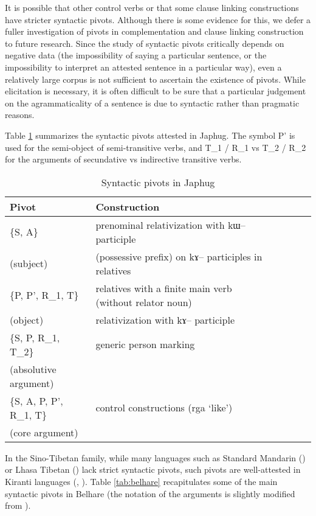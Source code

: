 \documentclass[oldfontcommands,oneside,a4paper,11pt]{article}
\newcommand{\ipa}[1]{{\phon #1}} %
\begin{document}
It is possible that other control verbs or that some clause linking constructions have  stricter syntactic pivots. Although there is some evidence for this, we defer a fuller investigation of pivots in complementation and clause linking construction to future research. Since the study of syntactic pivots critically depends on negative data (the impossibility of saying a particular sentence, or the impossibility to interpret an attested sentence in a particular way), even a relatively large corpus is not sufficient to ascertain the existence of pivots. While elicitation is necessary, it is often difficult to be sure that a particular judgement on the agrammaticality of a sentence is due to syntactic rather than pragmatic reasons. 
 
Table \ref{tab:japhug.pivot} summarizes the syntactic pivots  attested in Japhug. The symbol P' is used for the semi-object of semi-transitive verbs, and T_1 / R_1 vs T_2 / R_2 for the arguments of secundative vs indirective transitive verbs.

\begin{table}[H]
\caption{Syntactic pivots in Japhug} \label{tab:japhug.pivot} \centering
\begin{tabular}{llllll}
\toprule
Pivot & Construction \\
\midrule
\{S, A\}  & prenominal relativization with \ipa{kɯ--} participle  \\
 (subject)&(possessive prefix) on \ipa{kɤ--} participles in relatives \\
 \midrule
\{P, P', R_1, T\}  & relatives with a finite main verb (without relator noun)\\
(object)  &relativization with \ipa{kɤ--} participle \\
\midrule
 \{S, P, R_1, T_2\} & generic person marking\\
 (absolutive argument)\\
 \midrule
  \{S, A, P, P', R_1, T\} & control constructions (\ipa{rga}  `like') \\
 (core argument)\\
\bottomrule
\end{tabular}
\end{table}

In the Sino-Tibetan family, while many languages such as Standard Mandarin (\citealt{lapolla93subject}) or Lhasa Tibetan  (\citealt{tounadre96erg}) lack strict syntactic pivots, such pivots are well-attested in Kiranti languages (\citealt{bickel01light.verbs}, \citealt{bickel04hidden}). Table \ref{tab:belhare} recapitulates some of the main syntactic pivots in Belhare (the notation of the arguments is slightly modified from \citealt{bickel04hidden}).
\end{document}
